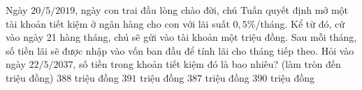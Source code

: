 \begin{ex}%
	Ngày $20/5/2019$, ngày con trai đầu lòng chào đời, chú Tuấn quyết định mở một tài khoản tiết kiệm ở ngân hàng cho con với lãi suất $0,5\%$/tháng. Kể từ đó, cứ vào ngày 21 hàng tháng, chú sẽ gửi vào tài khoản một triệu đồng. Sau mỗi tháng, số tiền lãi sẽ được nhập vào vốn ban đầu để tính lãi cho tháng tiếp theo. Hỏi vào ngày $22/5/2037$, số tiền trong khoản tiết kiệm đó là bao nhiêu? (làm tròn đến triệu đồng)
	\choice
	{$388$ triệu đồng}
	{$391$ triệu đồng}
	{$387$ triệu đồng}
	{\True $390$ triệu đồng}
\end{ex}

